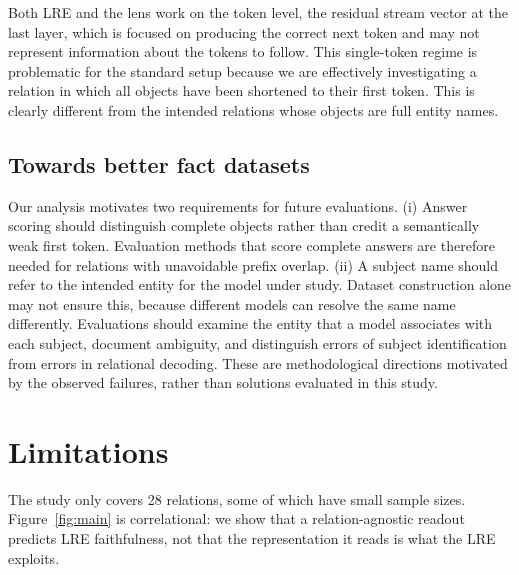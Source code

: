\documentclass{article}
\begin{document}
Both LRE and the lens work on the token level, the residual
stream vector at the last layer, which is focused on
producing the correct next token and may not represent
information about the tokens to follow. This
single-token regime is problematic for the standard
setup because we are effectively investigating a relation in
which all objects have been shortened to their first
token. This 
is clearly different from the intended relations
whose objects are full entity names.

\subsection{Towards better fact datasets}
Our analysis motivates two requirements for future evaluations. (i)
Answer scoring should distinguish complete objects rather than credit a 
semantically weak first token.
Evaluation methods that score complete answers
are therefore needed for relations with unavoidable prefix overlap.
(ii) A subject name should refer to the intended entity for the model under
study. Dataset construction alone may not ensure this, because different models
can resolve the same name differently. Evaluations should examine the entity
that a model associates with each subject, document ambiguity, and distinguish
errors of subject identification from errors in relational decoding. These are
methodological directions motivated by the observed failures, rather than
solutions evaluated in this study.






\section{Limitations}
\label{sec:limitations}

The study only covers 28 relations,
some of which have small sample sizes.
Figure~\ref{fig:main}
is
correlational: we show that a relation-agnostic readout predicts LRE
faithfulness, not that the representation it reads is what the LRE
exploits.
\end{document}
